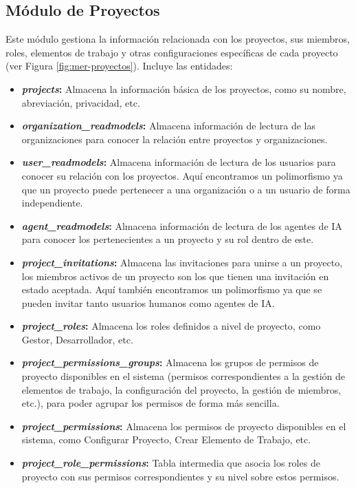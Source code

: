 \subsection{Módulo de Proyectos}
Este módulo gestiona la información relacionada con los proyectos, sus miembros, roles, elementos de trabajo y otras configuraciones específicas de cada proyecto (ver Figura \ref{fig:mer-proyectos}). Incluye las entidades:
\begin{itemize}
    \item \textbf{\emph{projects}:} Almacena la información básica de los proyectos, como su nombre, abreviación, privacidad, etc.
    \item \textbf{\emph{organization\_readmodels}:} Almacena información de lectura de las organizaciones para conocer la relación entre proyectos y organizaciones.
    \item \textbf{\emph{user\_readmodels}:} Almacena información de lectura de los usuarios para conocer su relación con los proyectos. Aquí encontramos un polimorfismo ya que un proyecto puede pertenecer a una organización o a un usuario de forma independiente.
    \item \textbf{\emph{agent\_readmodels}:} Almacena información de lectura de los agentes de \ac{IA} para conocer los pertenecientes a un proyecto y su rol dentro de este.
    \item \textbf{\emph{project\_invitations}:} Almacena las invitaciones para unirse a un proyecto, los miembros activos de un proyecto son los que tienen una invitación en estado aceptada. Aquí también encontramos un polimorfismo ya que se pueden invitar tanto usuarios humanos como agentes de \ac{IA}.
    \item \textbf{\emph{project\_roles}:} Almacena los roles definidos a nivel de proyecto, como Gestor, Desarrollador, etc.
    \item \textbf{\emph{project\_permissions\_groups}:} Almacena los grupos de permisos de proyecto disponibles en el sistema (permisos correspondientes a la gestión de elementos de trabajo, la configuración del proyecto, la gestión de miembros, etc.), para poder agrupar los permisos de forma más sencilla.
    \item \textbf{\emph{project\_permissions}:} Almacena los permisos de proyecto disponibles en el sistema, como Configurar Proyecto, Crear Elemento de Trabajo, etc.
    \item \textbf{\emph{project\_role\_permissions}:} Tabla intermedia que asocia los roles de proyecto con sus permisos correspondientes y su nivel sobre estos permisos.

\end{itemize}
